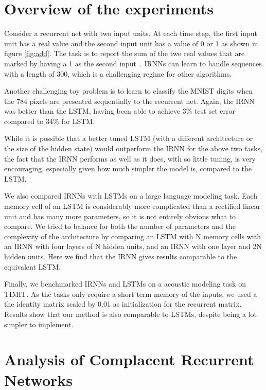 \documentclass{article} \usepackage{nips14submit_e,times,graphicx}
\begin{document}
\section{Overview of the experiments}

Consider a recurrent net with two input units. At each time step, the
first input unit has a real value and the second input unit has a
value of 0 or 1 as shown in figure \ref{fig:add}.  The task is to
report the sum of the two real values that are marked by having a 1 as
the second input~\cite{hochreiter97,hoch01,martens11}. IRNNs can learn
to handle sequences with a length of 300, which is a challenging
regime for other algorithms.

Another challenging toy problem is to learn to classify the MNIST
digits when the 784 pixels are presented sequentially to the recurrent
net. Again, the IRNN was better than the LSTM, having been able to
achieve 3\% test set error compared to 34\% for LSTM.

While it is possible that a better tuned LSTM (with a different
architecture or the size of the hidden state) would outperform the
IRNN for the above two tasks, the fact that the IRNN performs as well
as it does, with so little tuning, is very encouraging, especially
given how much simpler the model is, compared to the LSTM.



We also compared IRNNs with LSTMs on a large language modeling
task. Each memory cell of an LSTM is considerably more complicated
than a rectified linear unit and has many more parameters, so it is
not entirely obvious what to compare.  We tried to balance for both
the number of parameters and the complexity of the architecture by
comparing an LSTM with N memory cells with an IRNN with four layers of
N hidden units, and an IRNN with one layer and 2N hidden units. Here we find
that the IRNN gives results comparable to the equivalent LSTM.

Finally, we benchmarked IRNNs and LSTMs on a acoustic modeling task on
TIMIT. As the tasks only require a short term memory of the inputs, we
used a the identity matrix scaled by 0.01 as initialization for the
recurrent matrix. Results show that our method is also comparable to
LSTMs, despite being a lot simpler to implement.



\iffalse

\section{Analysis of Complacent Recurrent Networks}
\end{document}
